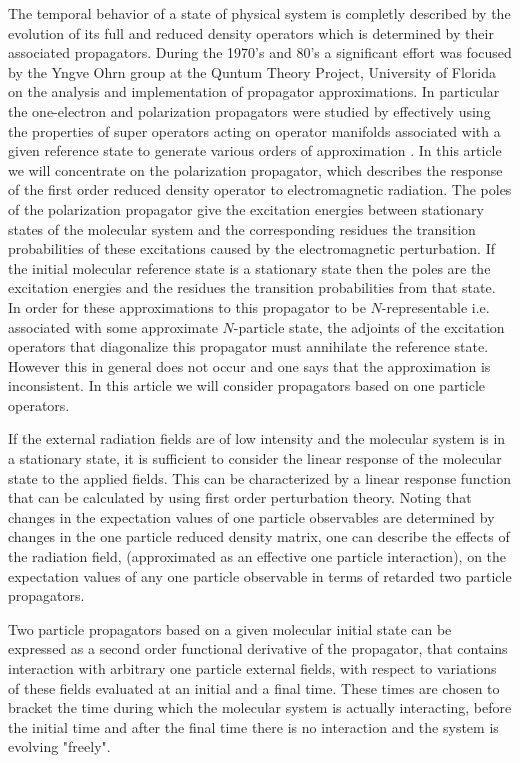 \documentclass[aps,preprint]{revtex4}%
\begin{document}
The temporal behavior of a state of physical system is completly described by
the evolution of its full and reduced density operators which is determined by
their associated propagators. During the 1970's and 80's a significant effort
was focused by the Yngve Ohrn group at the Quntum Theory Project, University
of Florida on the analysis and implementation of propagator approximations. In
particular the one-electron and polarization propagators were studied by
effectively using the properties of super operators acting on operator
manifolds associated with a given reference state to generate various orders
of approximation \cite{Ohrn, Weiner, Ortiz, Kurtz, Jensen etc}. In this
article we will concentrate on the polarization propagator, which describes
the response of the first order reduced density operator to electromagnetic
radiation. The poles of the polarization propagator give the excitation
energies between stationary states of the molecular system and the
corresponding residues the transition probabilities of these excitations
caused by the electromagnetic perturbation. If the initial molecular reference
state is a stationary state then the poles are the excitation energies and the
residues the transition probabilities from that state. In order for these
approximations to this propagator to be $N$-representable i.e. associated with
some approximate $N$-particle state, the adjoints of the excitation operators
that diagonalize this propagator must annihilate the reference state. However
this in general does not occur and one says that the approximation is
inconsistent. In this article we will consider propagators based on one
particle operators.

If the external radiation fields are of low intensity and the molecular system
is in a stationary state, it is sufficient to consider the linear response of
the molecular state to the applied fields. This can be characterized by a
linear response function that can be calculated by using first order
perturbation theory. Noting that changes in the expectation values of one
particle observables are determined by changes in the one particle reduced
density matrix, one can describe the effects of the radiation field,
(approximated as an effective one particle interaction), on the expectation
values of any one particle observable in terms of retarded two particle propagators.

Two particle propagators based on a given molecular initial state can be
expressed as a second order functional derivative of the propagator, that
contains interaction with arbitrary one particle external fields, with respect
to variations of these fields evaluated at an initial and a final time. These
times are chosen to bracket the time during which the molecular system is
actually interacting, before the initial time and after the final time there
is no interaction and the system is evolving "freely".
\end{document}

